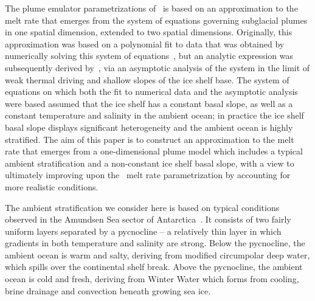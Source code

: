 \documentclass[openacc]{rsproca_new}%
\begin{document}
The plume emulator parametrizations of~\cite{Lazeroms2018TheCryo} is based on an approximation to the melt rate that emerges from the system of equations governing subglacial plumes in one spatial dimension, extended to two spatial dimensions. Originally, this approximation was based on a polynomial fit to data that was obtained by numerically solving this system of equations~\citep{Jenkins2014scaling}, but an analytic expression was subsequently derived by~\cite{Lazeroms2019JPhysOcean}, via an asymptotic analysis of the system in the limit of weak thermal driving and shallow slopes of the ice shelf base. The system of equations on which both the fit to numerical data and the asymptotic analysis were based assumed that the ice shelf has a constant basal slope, as well as a constant temperature and salinity in the ambient ocean; in practice the ice shelf basal slope displays significant heterogeneity and the ambient ocean is highly stratified. The aim of this paper is to construct an approximation to the melt rate that emerges from a one-dimensional plume model which includes a typical ambient stratification and a non-constant ice shelf basal slope, with a view to ultimately improving upon the~\cite{Lazeroms2018TheCryo} melt rate parametrization by accounting for more realistic conditions.

The ambient stratification we consider here is based on typical conditions observed in the Amundsen Sea sector of Antarctica~\cite{Jenkins2018NatureGeo}. It consists of two fairly uniform layers separated by a pycnocline -- a relatively thin layer in which gradients in both temperature and salinity are strong. Below the pycnocline, the ambient ocean is warm and salty, deriving from modified circumpolar deep water, which spills over the continental shelf break. Above the pycnocline, the ambient ocean is cold and fresh, deriving from Winter Water which forms from cooling, brine drainage and convection beneath growing sea ice.
\end{document}
